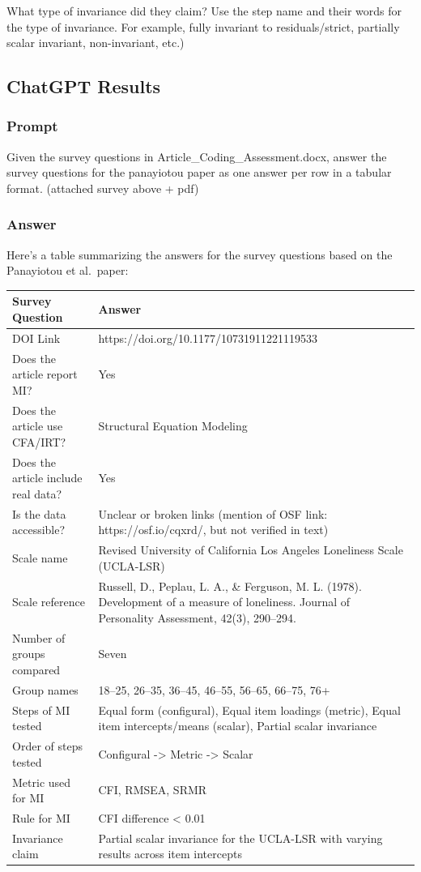 \documentclass[
  english,
  man]{apa7}
\begin{document}
What type of invariance did they claim? Use the step name and their words for the type of invariance. For example, fully invariant to residuals/strict, partially scalar invariant, non-invariant, etc.)

\subsection{ChatGPT Results}\label{chatgpt-results}

\subsubsection{Prompt}\label{prompt}

Given the survey questions in Article\_Coding\_Assessment.docx, answer the survey questions for the panayiotou paper as one answer per row in a tabular format. (attached survey above + pdf)

\subsubsection{Answer}\label{answer}

Here's a table summarizing the answers for the survey questions based on the Panayiotou et al.~paper:

\begin{tabular}{l|l}
\hline
Survey Question & Answer\\
\hline
DOI Link & https://doi.org/10.1177/10731911221119533\\
\hline
Does the article report MI? & Yes\\
\hline
Does the article use CFA/IRT? & Structural Equation Modeling\\
\hline
Does the article include real data? & Yes\\
\hline
Is the data accessible? & Unclear or broken links (mention of OSF link: https://osf.io/cqxrd/, but not verified in text)\\
\hline
Scale name & Revised University of California Los Angeles Loneliness Scale (UCLA-LSR)\\
\hline
Scale reference & Russell, D., Peplau, L. A., \& Ferguson, M. L. (1978). Development of a measure of loneliness. Journal of Personality Assessment, 42(3), 290–294.\\
\hline
Number of groups compared & Seven\\
\hline
Group names & 18–25, 26–35, 36–45, 46–55, 56–65, 66–75, 76+\\
\hline
Steps of MI tested & Equal form (configural), Equal item loadings (metric), Equal item intercepts/means (scalar), Partial scalar invariance\\
\hline
Order of steps tested & Configural -> Metric -> Scalar\\
\hline
Metric used for MI & CFI, RMSEA, SRMR\\
\hline
Rule for MI & CFI difference < 0.01\\
\hline
Invariance claim & Partial scalar invariance for the UCLA-LSR with varying results across item intercepts\\
\hline
\end{tabular}
\end{document}
